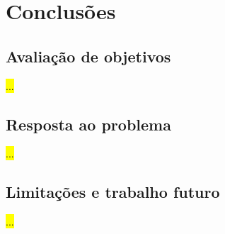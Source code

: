 \chapter{Conclusões}
\label{chap:Chapter5}


\section{Avaliação de objetivos} 
\label{sec:chap5_goals_evaluation}
\hl{...}


\section{Resposta ao problema} 
\label{sec:chap5_problem_response}
\hl{...}


\section{Limitações e trabalho futuro} 
\label{sec:chap5_future_work_limitations}
\hl{...}

